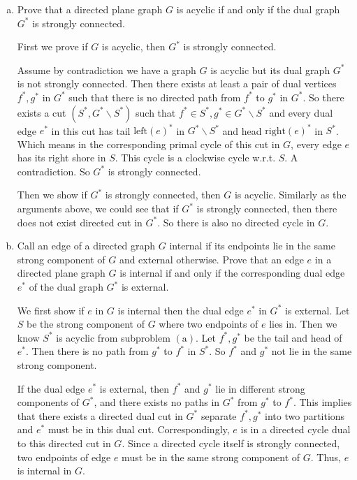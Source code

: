 \documentclass[11pt]{article}
\begin{document}
\begin{enumerate}[(a)]
\item Prove that a directed plane graph \(G\) is acyclic if and only if the dual graph \(G^*\) is strongly connected.
  \begin{solution}
    First we prove if \(G\) is acyclic, then \(G^*\) is strongly connected.

    Assume by contradiction we have a graph \(G\) is acyclic but its dual graph \(G^*\) is not strongly connected.
    Then there exists at least a pair of dual vertices \(f^*,g^*\) in \(G^*\) such that there is no directed path from \(f^*\) to \(g^*\) in \(G^*\). So there exists a cut \((S^*,G^*\backslash S^*)\) such that \(f^*\in S^*, g^*\in G^*\backslash S^*\) and every dual edge \(e^*\) in this cut has tail \(\mathrm{left}(e)^*\) in \(G^*\backslash S^*\) and head \(\mathrm{right}(e)^*\) in \(S^*\). Which means in the corresponding primal cycle of this cut in \(G\), every edge \(e\) has its right shore in \(S\). This cycle is a clockwise cycle w.r.t. \(S\). A contradiction. So \(G^*\) is strongly connected.

    Then we show if \(G^*\) is strongly connected, then \(G\) is acyclic. Similarly as the arguments above, we could see that if \(G^*\) is strongly connected, then there does not exist directed cut in \(G^*\). So there is also no directed cycle in \(G\).

  \end{solution}
\item Call an edge of a directed graph \(G\) internal if its endpoints lie in the same strong component of \(G\) and external otherwise. Prove that an edge \(e\) in a directed plane graph \(G\) is internal if and only if the corresponding dual edge \(e^*\) of the dual graph \(G^*\) is external.
  \begin{solution}
    We first show if \(e\) in \(G\) is internal then the dual edge \(e^*\) in \(G^*\) is external.
    Let \(S\) be the strong component of \(G\) where two endpoints of \(e\) lies in. Then we know \(S^*\) is acyclic from subproblem \((\mathrm{a})\).
    Let \(f^*,g^*\) be the tail and head of \(e^*\). Then there is no path from \(g^*\) to \(f^*\) in \(S^*\). So \(f^*\) and \(g^*\) not lie in the same strong component.

    If the dual edge \(e^*\) is external, then \(f^*\) and \(g^*\) lie in different strong components of \(G^*\), and there exists no paths in \(G^*\) from \(g^*\) to \(f^*\). This implies that there exists a directed dual cut in \(G^*\) separate \(f^*, g^*\) into two partitions and \(e^*\) must be in this dual cut. Correspondingly, \(e\) is in a directed cycle dual to this directed cut in \(G\). Since a directed cycle itself is strongly connected, two endpoints of edge \(e\) must be in the same strong component of \(G\). Thus, \(e\) is internal in \(G\).

  \end{solution}

\end{enumerate}
\end{document}
